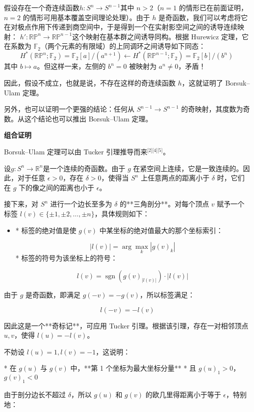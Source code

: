 假设存在一个奇连续函数$h : S^n \to S^{n-1}$其中 $n > 2$（$n=1$ 的情形已在前面证明，$n=2$ 的情形可用基本覆盖空间理论处理）。由于 $h$ 是奇函数，我们可以考虑将它在对极点作用下传递到商空间中，于是得到一个在实射影空间之间的诱导连续映射：
$h' : \mathbb{RP}^n \to \mathbb{RP}^{n-1}$这个映射在基本群之间诱导同构。根据 Hurewicz 定理，它在系数为 $\mathbb{F}_2$（两个元素的有限域）的上同调环之间诱导如下同态：
$$
H^*(\mathbb{RP}^n; \mathbb{F}_2) = \mathbb{F}_2[a]/(a^{n+1}) \leftarrow H^*(\mathbb{RP}^{n-1}; \mathbb{F}_2) = \mathbb{F}_2[b]/(b^n)~
$$
其中 $b \mapsto a$。但这样一来，左侧的 $b^n = 0$ 被映射为 $a^n \neq 0$，矛盾！

因此，假设不成立，也就是说，不存在这样的奇连续函数 $h$，这就证明了 Borsuk–Ulam 定理。

另外，也可以证明一个更强的结论：任何从 $S^{n-1} \to S^{n-1}$ 的奇映射，其度数为奇数。从这个结论也可以推出 Borsuk–Ulam 定理。

\textbf{组合证明}

Borsuk–Ulam 定理可以由 Tucker 引理推导而来\(^\text{[2][4][5]}\)。

设$g : S^n \to \mathbb{R}^n$是一个连续的奇函数。由于 $g$ 在紧空间上连续，它是一致连续的。因此，对于任意 $\epsilon > 0$，存在 $\delta > 0$，使得当 $S^n$ 上任意两点的距离小于 $\delta$ 时，它们在 $g$ 下的像之间的距离也小于 $\epsilon$。

接下来，对 $S^n$ 进行一个边长至多为 $\delta$ 的**三角剖分**。对每个顶点 $v$ 赋予一个标签 $l(v) \in \{\pm 1, \pm 2, \dots, \pm n\}$，具体规则如下：

\begin{itemize}
\item * 标签的绝对值是使 $g(v)$ 中某坐标的绝对值最大的那个坐标索引：

  $$
  |l(v)| = \arg \max_k |g(v)_k|~
  $$
* 标签的符号为该坐标上的符号：

  $$
  l(v) = \operatorname{sgn}(g(v)_{|l(v)|}) \cdot |l(v)|~
  $$
\end{itemize}

由于 $g$ 是奇函数，即满足 $g(-v) = -g(v)$，所以标签满足：

$$
l(-v) = -l(v)
$$

因此这是一个**奇标记**，可应用 Tucker 引理。根据该引理，存在一对相邻顶点 $u, v$，使得 $l(u) = -l(v)$。

不妨设 $l(u) = 1, l(v) = -1$，这说明：

* 在 $g(u)$ 与 $g(v)$ 中，**第 1 个坐标为最大坐标分量**
* 且 $g(u)_1 > 0$，$g(v)_1 < 0$

由于剖分边长不超过 $\delta$，所以 $g(u)$ 和 $g(v)$ 的欧几里得距离小于等于 $\epsilon$，特别地：

